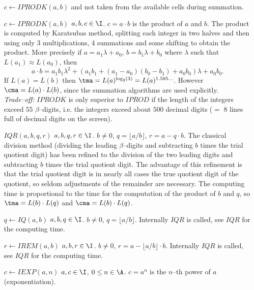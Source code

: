\begin{deflist}{$c \gets IPRODK(a,b)$}
     and not taken from the available cells during summation. 
\item[$c \gets IPRODK(a,b)$] $a, b, c \in \I$.
     $c = a \cdot b$ is the product of $a$ and $b$.
     The product is computed by Karatsubas method, 
     splitting each integer in two halves and then using only
     3 multiplications, 4 summations and some shifting 
     to obtain the product.
     More precisely
     if $a = a_1 \lambda + a_0$, $b = b_1 \lambda + b_0$ 
     where $\lambda$ such that $L(a_1) \approx L(a_0)$, then
     $$a \cdot b = 
            a_1 b_1 \lambda^2
          + ( a_1 b_1 
              + (a_1 - a_0) (b_0 - b_1) 
              +  a_0 b_0 ) \lambda
          + a_0 b_0.$$
     If $L(a) = L(b)$ then    
     $\tma = L(a)^{\log_2(3)} = L(a)^{1.585\ldots}$. 
     However $\cma = L(a) \cdot L(b)$, since the summation algorithms
     are used explicitly.
     \\
     {\em Trade--off:} $IPRODK$ is only superior to $IPROD$ if 
     the length of the integers exceed $55$ $\beta$--digits,
     i.e. the integers exceed about $500$ decimal digits 
     ($=$ $8$ lines full of decimal digits on the screen).   
\item[$IQR(a,b, q,r)$] $a, b, q, r \in \I$.
     $b \neq 0$, $q = \lfloor a/b \rfloor$, $r = a - q \cdot b$.
     The classical division method (dividing the leading
     $\beta$--digits and subtracting $b$ times the 
     trial quotient digit)
     has been refined to the division of the two leading 
     digits and subtracting $b$ times the trial quotient digit.
     The advantage of this refinement is that the trial
     quotient digit is in nearly all cases the true quotient digit 
     of the quotient, so seldom adjustments of the remainder 
     are necessary. 
     The computing time is proportional to 
     the time for the computation of the product of $b$ and $q$, so  
     $\tma = L(b) \cdot L(q)$ and $\cma = L(b) \cdot L(q)$.
\item[$q \gets IQ(a,b)$] $a, b, q \in \I$.
     $b \neq 0$, $q = \lfloor a/b \rfloor$. 
     Internally $IQR$ is called, see $IQR$ for the
     computing time.
\item[$r \gets IREM(a,b)$] $a, b, r \in \I$.
     $b \neq 0$, $r = a - \lfloor a/b \rfloor \cdot b$.
     Internally $IQR$ is called, see $IQR$ for the
     computing time.
\item[$c \gets IEXP(a,n)$] $a, c \in \I$, $0 \leq n \in \A$.
     $c = a^n$ is the $n$--th power of $a$ (exponentiation).

\end{deflist}
